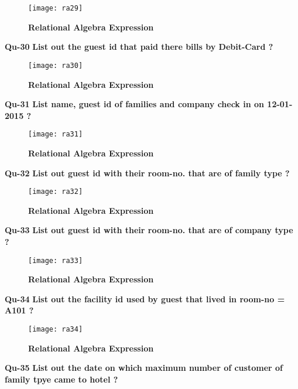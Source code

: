 \documentclass[a4,12pt]{report}
\begin{document}
\begin{figure}[hbtp]
\centering
\texttt{[image: ra29]}
\caption{\textbf{{\color{red}Relational Algebra Expression}}}
\end{figure}

\textbf{Qu-30} \textbf{ List out the guest id that paid there bills by Debit-Card ? }\\

\begin{figure}[hbtp]
\centering
\texttt{[image: ra30]}
\caption{\textbf{{\color{red}Relational Algebra Expression}}}
\end{figure}

\newpage
\textbf{Qu-31} \textbf{ List name, guest id of families and company check in on 12-01-2015 ? }\\

\begin{figure}[hbtp]
\centering
\texttt{[image: ra31]}
\caption{\textbf{{\color{red}Relational Algebra Expression}}}
\end{figure}

\textbf{Qu-32} \textbf{ List out guest id with their room-no. that are of family type ? }\\

\begin{figure}[hbtp]
\centering
\texttt{[image: ra32]}
\caption{\textbf{{\color{red}Relational Algebra Expression}}}
\end{figure}

\newpage
\textbf{Qu-33} \textbf{ List out guest id with their room-no. that are of company type ? }\\

\begin{figure}[hbtp]
\centering
\texttt{[image: ra33]}
\caption{\textbf{{\color{red}Relational Algebra Expression}}}
\end{figure}

\textbf{Qu-34} \textbf{ List out the facility id used by guest that lived in room-no = A101 ? }\\

\begin{figure}[hbtp]
\centering
\texttt{[image: ra34]}
\caption{\textbf{{\color{red}Relational Algebra Expression}}}
\end{figure}

\textbf{Qu-35} \textbf{ List out the date on which maximum number of customer of family tpye came to hotel ? }\\
\end{document}
